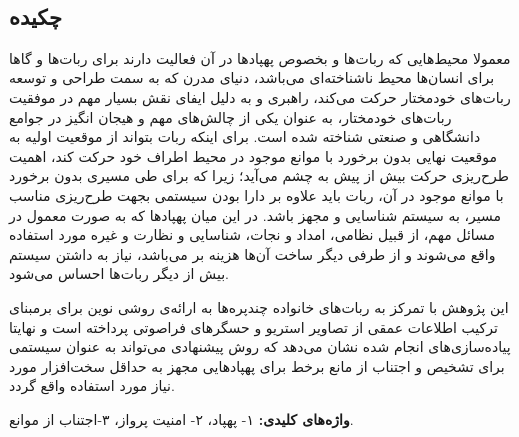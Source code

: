 
\setcounter{page}{1}
\thispagestyle{empty}

~\vfill

\subsection*{چکیده}
\begin{small}
\baselineskip=0.7cm
معمولا محیط‌هایی که ربات‌ها و بخصوص پهپادها در آن فعالیت دارند برای ربات‌ها و گاها برای انسان‌ها محیط‌ ناشناخته‌ای می‌باشد، دنیای مدرن که به سمت طراحی و توسعه ربات‌های خودمختار حرکت می‌کند، راهبری و  به دلیل ایفای نقش بسیار مهم در موفقیت ربات‌های خودمختار، به عنوان یکی از چالش‌های مهم و هیجان انگیز در جوامع دانشگاهی و صنعتی شناخته شده است. برای اینکه ربات بتواند از موقعیت اولیه به موقعیت نهایی بدون برخورد با موانع موجود در محیط اطراف خود حرکت کند، اهمیت طرح‌ریزی حرکت بیش از پیش به چشم می‌آید؛ زیرا که برای طی مسیری بدون برخورد با موانع موجود در آن، ربات باید علاوه بر دارا بودن سیستمی بجهت طرح‌ریزی مناسب مسیر، به سیستم شناسایی و  مجهز باشد. در این میان پهپادها که به صورت معمول در مسائل مهم، از قبیل نظامی، امداد و نجات، شناسایی و نظارت و غیره مورد استفاده واقع می‌شوند و از طرفی دیگر ساخت آن‌ها هزینه بر می‌باشد، نیاز به داشتن سیستم‌  بیش از دیگر ربات‌ها احساس می‌شود.

این پژوهش با تمرکز به ربات‌های خانواده چندپره‌ها به ارائه‌ی روشی نوین برای  برمبنای ترکیب اطلاعات عمقی از تصاویر استریو و حسگرهای فراصوتی پرداخته است و نهایتا پیاده‌سازی‌های انجام شده نشان می‌دهد که روش پیشنهادی می‌تواند به عنوان سیستمی برای تشخیص و اجتناب از مانع برخط برای پهپادهایی مجهز به حداقل سخت‌افزار مورد نیاز مورد استفاده واقع گردد.
\vspace*{0.5 cm}

\noindent\textbf{واژه‌های کلیدی:}
۱- پهپاد، ۲- امنیت پرواز، ۳-اجتناب از موانع.
\end{small}